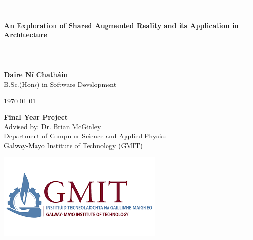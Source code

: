 \documentclass{report}
\newcommand{\projecttitle}{ An Exploration of Shared Augmented Reality and its Application in Architecture }
\newcommand{\projectauthor}{Daire Ní Chatháin}
\newcommand{\projectadvisor}{Dr. Brian McGinley}
\newcommand{\projectprogramme}{B.Sc.(Hons) in Software Development}
\newcommand{\projectdate}{\today}
\begin{document}
  \begin{titlepage}
    \begin{minipage}[t][4cm]{\textwidth}
      \centering
      \rule{\linewidth}{0.5mm} \\[0.4cm]
      { \LARGE \bfseries \projecttitle \\[0.4cm] }
      \rule{\linewidth}{0.5mm} \\[0.8cm]
    \end{minipage}
    
    \begin{minipage}[t][6.5cm]{\textwidth}
      \centering
      \textbf{\projectauthor}\\[0.4cm]
      \projectprogramme
    \end{minipage}
  
    \begin{minipage}[t][1cm]{\textwidth}
      \centering
      \textsc{\projectdate}
    \end{minipage}
      
    \begin{minipage}[t][3cm]{\textwidth}
      \centering
      \textbf{Final Year Project}\\[0.3cm]
      Advised by: \projectadvisor \\[0.1cm]
      Department of Computer Science and Applied Physics\\
      Galway-Mayo Institute of Technology (GMIT)
    \end{minipage}

    \begin{center}    
      \includegraphics[scale=0.7]{./images/gmit.png}
    \end{center}
  \end{titlepage}
  \setcounter{page}{1}
\
\tableofcontents
\begin{abstract}

Shared augmented reality, is an emerging technology showing promising value in a wide range of disciplines. This project seeks to examine shared augmented reality through the lens of its value in the field of architecture. 
In the first section of this dissertation, an investigation into the current tools available for the creation of shared augmented reality experiences is conducted. An evaluation of these tools is completed highlighting how each tool can be applied to implement a multi-user augmented reality experience. Following this, a selection of technologies are applied to create a cross-platform mobile application featuring shared augmented reality functionality, for use in architecture. To conclude, the shared-augmented reality system is presented and evaluated. 
   
\end{abstract}
\end{document}
